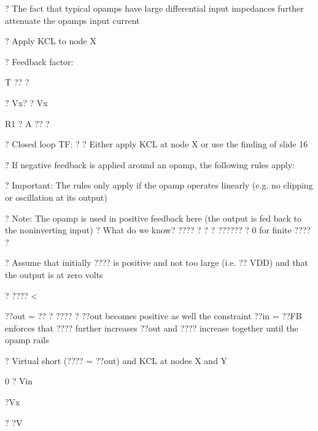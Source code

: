 \documentclass[2pt,landscape]{article}
\begin{document}
\begin{multicols*}{5}
?	The fact that typical opamps have large differential input impedances
further attenuate the opamp\textbullet s input current





?	Apply KCL to node X




























?	Feedback factor:


T ?? ?


? Vx? ?
Vx


R1	? A ?? ?


?	Closed loop TF:	? ?
\textbullet 	Either apply KCL at node X or use the finding of slide 16








?	If negative feedback is applied around an opamp, the following rules
apply:

?	Important: The rules only apply if the opamp operates linearly (e.g. no 
clipping or oscillation at its output)




?	Note: The opamp is used in positive feedback here (the output is fed
back to the noninverting input)
?	What do we know? ???? ? ? ? ?????? ? 0 for finite ???? ?


?	Assume that initially ???? is positive and not too large (i.e. ?? 
VDD) and that the output is at zero volts


? ???? <


??out = ??	? ???? ? ??out becomes positive as well
the constraint ??in = ??FB  enforces that ???? further increases
??out and ???? increase together until the opamp rails





?	Virtual short (???? = ??out) and KCL at nodes X and Y


0 ? Vin


?Vx


? ?V



\end{multicols*}
\end{document}
